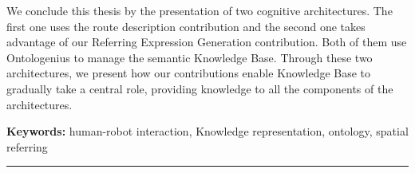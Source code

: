 \documentclass[english,a4paper,11pt,twoside]{StyleThese}
\begin{document}
\begin{vcenterpage}
We conclude this thesis by the presentation of two cognitive architectures. The first one uses the route description contribution and the second one takes advantage of our Referring Expression Generation contribution. Both of them use Ontologenius to manage the semantic Knowledge Base. Through these two architectures, we present how our contributions enable Knowledge Base to gradually take a central role, providing knowledge to all the components of the architectures.


\textbf{Keywords:} human-robot interaction, Knowledge representation, ontology, spatial referring
\\
\noindent\rule[2pt]{\textwidth}{0.5pt}
\end{vcenterpage}
\end{document}
